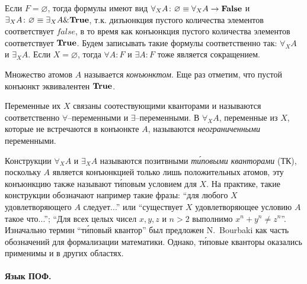\documentclass[a4paper]{jctart15b}
\begin{document}
Если $F = \varnothing$, тогда формулы имеют вид $\forall_XA\colon\varnothing \equiv \forall_XA \rightarrow \text{\textbf{False}}$ и $\exists_XA\colon\varnothing \equiv \exists_XA \& \text{\textbf{True}}$, т.к. дизъюнкция пустого количества элементов соответствует $false$, в то время как конъюнкция пустого количества элементов соответствует $\text{\textbf{True}}$. Будем записывать такие формулы соответственно так: $\forall_XA$ и $\exists_XA$. Если $X = \varnothing$, тогда $\forall A\colon F$ и $\exists A\colon F$ тоже является сокращением.

Множество атомов $A$ называется {\em конъюнктом}. Еще раз отметим, что пустой конъюнкт эквивалентен $\text{\textbf{True}}$.

Переменные их $X$ связаны соотествующими кванторами и называются соответственно $\forall$--переменными и $\exists$--переменными. В $\forall_XA$, переменные из $X$, которые не встречаются в конъюнкте $A$, называются {\em неограниченными} переменными.


Конструкции $\forall_XA$ и $\exists_XA$ называются позитвными \emph{т\'иповыми кванторами} (ТК), поскольку $A$ является конъюнкцией только лишь положительных атомов, эту конъюнкцию также называют т\'иповым условием для $X$. На практике, такие конструкции  обозначают например такие фразы: ``для любого $X$ удовлетворяющего $A$ следует...'' или ``существует $X$ удовлетворяющее условию $A$ такое что...''; ``Для всех целых чисел $x,y,z$ и $n>2$ выполнимо $x^n + y^n \ne z^n$''. Изначально термин ``т\'иповый квантор'' был предложен N.~Bourbaki \cite{Bourbaki} как часть обозначений для формализации математики. Однако, т\'иповые кванторы оказались применимы и в других областях.

\paragraph{Язык ПОФ.}
\end{document}
